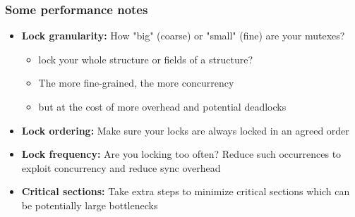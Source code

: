 \documentclass[aspectratio=43,11pt]{beamer}
\begin{document}
\begin{frame}
  \frametitle{Some performance notes}
  
  \begin{itemize}
    \item \textbf{Lock granularity:} How "big" (coarse) or "small" (fine) are your mutexes?
    \begin{itemize}
      \item lock your whole structure or fields of a structure?
      \item The more fine-grained, the more concurrency
      \item but at the cost of more overhead and potential deadlocks
    \end{itemize}
    \item \textbf{Lock ordering:} Make sure your locks are always locked in an agreed order
    \item \textbf{Lock frequency:} Are you locking too often? Reduce such occurrences to
    exploit concurrency and reduce sync overhead
    \item \textbf{Critical sections:} Take extra steps to minimize critical sections which
    can be potentially large bottlenecks
  \end{itemize}
  
\end{frame}
\end{document}
